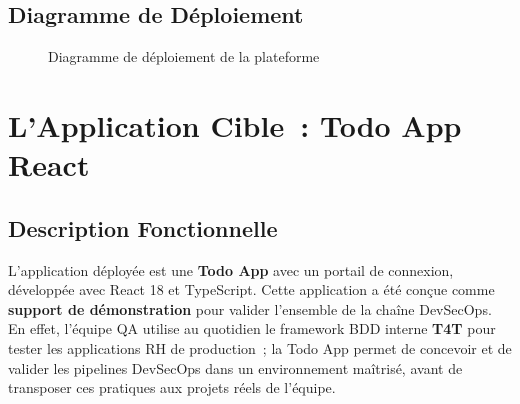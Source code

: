\subsection{Diagramme de Déploiement}

\begin{figure}[H]
    \centering
    \caption{Diagramme de déploiement de la plateforme}
    \label{fig:deployment_diagram}
\end{figure}


\section{L'Application Cible~: Todo App React}

\subsection{Description Fonctionnelle}

L'application déployée est une \textbf{Todo App} avec un portail de connexion, développée
avec React 18 et TypeScript. Cette application a été conçue comme \textbf{support de
démonstration} pour valider l'ensemble de la chaîne DevSecOps. En effet, l'équipe QA
utilise au quotidien le framework BDD interne \textbf{T4T} pour tester les applications RH
de production~; la Todo App permet de concevoir et de valider les pipelines DevSecOps dans un
environnement maîtrisé, avant de transposer ces pratiques aux projets réels de l'équipe.

